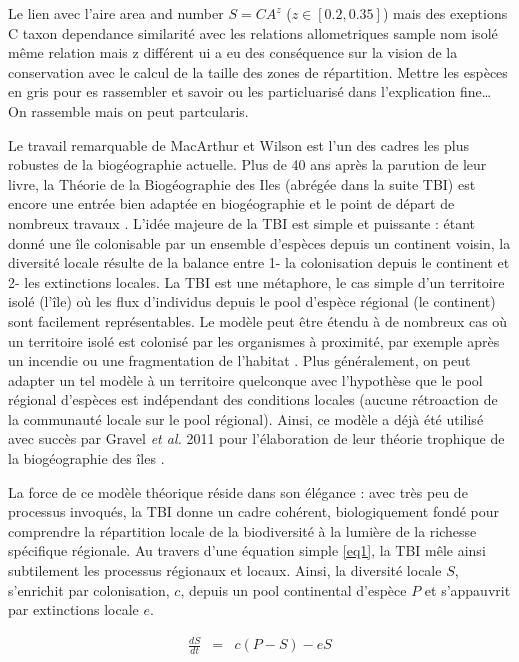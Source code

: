 Le lien avec l'aire area and number \(S=CA^z\) (\(z \in [0.2,0.35]\))
mais des exeptions C taxon dependance similarité avec les relations
allometriques sample nom isolé même relation mais z différent ui a eu
des conséquence sur la vision de la conservation avec le calcul de la
taille des zones de répartition. Mettre les espèces en gris pour es
rassembler et savoir ou les particluarisé dans l'explication
fine\ldots{} On rassemble mais on peut partcularis.

Le travail remarquable de MacArthur et Wilson \cite{MacArthur1967} est
l'un des cadres les plus robustes de la biogéographie actuelle. Plus de
40 ans après la parution de leur livre, la Théorie de la Biogéographie
des Iles (abrégée dans la suite TBI) est encore une entrée bien adaptée
en biogéographie et le point de départ de nombreux travaux
\cite{Gravel2011b,Ryberg2007,Rosindell2011}. L'idée majeure de la TBI
est simple et puissante : étant donné une île colonisable par un
ensemble d'espèces depuis un continent voisin, la diversité locale
résulte de la balance entre 1- la colonisation depuis le continent et 2-
les extinctions locales. La TBI est une métaphore, le cas simple d'un
territoire isolé (l'île) où les flux d'individus depuis le pool d'espèce
régional (le continent) sont facilement représentables. Le modèle peut
être étendu à de nombreux cas où un territoire isolé est colonisé par
les organismes à proximité, par exemple après un incendie ou une
fragmentation de l'habitat \cite{Cook2002}. Plus généralement, on peut
adapter un tel modèle à un territoire quelconque avec l'hypothèse que le
pool régional d'espèces est indépendant des conditions locales (aucune
rétroaction de la communauté locale sur le pool régional). Ainsi, ce
modèle a déjà été utilisé avec succès par Gravel \textit{et al.} 2011
pour l'élaboration de leur théorie trophique de la biogéographie des
îles \cite{Gravel2011b}.

La force de ce modèle théorique réside dans son élégance : avec très peu
de processus invoqués, la TBI donne un cadre cohérent, biologiquement
fondé pour comprendre la répartition locale de la biodiversité à la
lumière de la richesse spécifique régionale. Au travers d'une équation
simple \eqref{eq1}, la TBI mêle ainsi subtilement les processus
régionaux et locaux. Ainsi, la diversité locale \(S\), s'enrichit par
colonisation, \(c\), depuis un pool continental d'espèce \(P\) et
s'appauvrit par extinctions locale \(e\).

\begin{eqnarray}
\label{eq1} \frac{dS}{dt}&=&c(P-S)-eS
\end{eqnarray}

